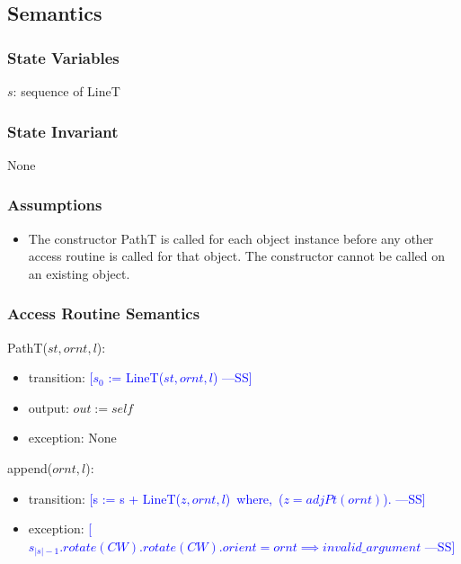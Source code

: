 \documentclass[12pt]{article}
\newcommand{\authornote}[3]{\textcolor{#1}{[#3 ---#2]}}
\newcommand{\authornote}[3]{}
\newcommand{\wss}[1]{\authornote{blue}{SS}{#1}}
\begin{document}
\subsection* {Semantics}

\subsubsection* {State Variables}

$s$: sequence of LineT

\subsubsection* {State Invariant}

None

\subsubsection* {Assumptions}

\begin{itemize}
\item The constructor PathT is called for each object instance before any other
access routine is called for that object.  The constructor cannot be called on
an existing object.
\end{itemize}

\subsubsection* {Access Routine Semantics}

PathT($st, ornt, l$):
\begin{itemize}
\item transition: \wss{$s_{0}$ := LineT($st, ornt, l$)}
\item output: $out := \mathit{self}$
\item exception: None
\end{itemize}

\noindent append($ornt, l$):
\begin{itemize}
\item transition: \wss{s := s + LineT($z, ornt, l$)\, where,\, ($z = adjPt(ornt)$).}
\item exception: \wss{$s_{|s|-1}.rotate(CW).rotate(CW).orient  = ornt \implies invalid\_argument$}
\end{itemize}
\end{document}
